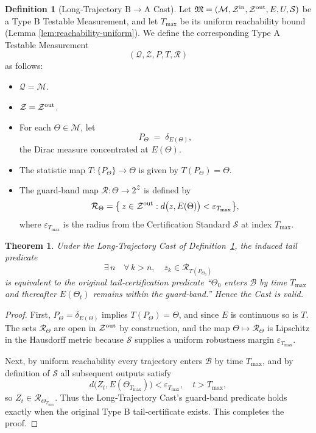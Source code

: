 \documentclass[12pt]{article}
\theoremstyle{definition}
\newtheorem{definition}{Definition}[section]
\theoremstyle{plain}
\newtheorem{theorem}{Theorem}[section]
\begin{document}
\begin{definition}[Long‐Trajectory \(\mathrm B\!\to\!\mathrm A\) Cast]
\label{def:long-trajectory-B-to-A}
Let \(\mathfrak M=(\mathcal M,\mathcal Z^{\rm in},\mathcal Z^{\rm out},E,U,\mathcal S)\) be a Type B Testable Measurement, and let \(T_{\max}\) be its uniform reachability bound (Lemma \ref{lem:reachability-uniform}).  We define the corresponding Type A Testable Measurement
\[
  (\mathcal Q,\mathcal Z,P,T,\mathcal R)
\]
as follows:
\begin{itemize}
  \item \(\mathcal Q = \mathcal M\).
  \item \(\mathcal Z = \mathcal Z^{\rm out}\).
  \item For each \(\Theta\in\mathcal M\), let
    \[
      P_{\Theta} \;=\;\delta_{E(\Theta)},
    \]
    the Dirac measure concentrated at \(E(\Theta)\).
  \item The statistic map 
    \(
      T:\{P_{\Theta}\}\to \Theta
    \) 
    is given by 
    \(T(P_{\Theta})=\Theta\).
  \item The guard‐band map 
    \(\mathcal R:\Theta\to2^{\mathcal Z}\) 
    is defined by
    \[
      \mathcal R_{\Theta}
      = \bigl\{\,z\in\mathcal Z^{\rm out} : d\bigl(z,E(\Theta)\bigr)<\varepsilon_{T_{\max}}\bigr\},
    \]
    where \(\varepsilon_{T_{\max}}\) is the radius from the Certification Standard \(\mathcal S\) at index \(T_{\max}\).
\end{itemize}
\end{definition}

\begin{theorem}
Under the Long‐Trajectory Cast of Definition \ref{def:long-trajectory-B-to-A}, the induced tail predicate
\[
  \exists\,n\quad\forall\,k>n,\quad
    z_k\in\mathcal R_{T(P_{\Theta_0})}
\]
is equivalent to the original tail‐certification predicate “\(\Theta_0\) enters \(\mathcal B\) by time \(T_{\max}\) and thereafter \(E(\Theta_t)\) remains within the guard‐band.”  Hence the Cast is valid.
\end{theorem}

\begin{proof}
First, \(P_{\Theta}=\delta_{E(\Theta)}\) implies \(T(P_{\Theta})=\Theta\), and since \(E\) is continuous so is \(T\).  The sets \(\mathcal R_{\Theta}\) are open in \(\mathcal Z^{\rm out}\) by construction, and the map \(\Theta\mapsto\mathcal R_{\Theta}\) is Lipschitz in the Hausdorff metric because \(\mathcal S\) supplies a uniform robustness margin \(\varepsilon_{T_{\max}}\).

Next, by uniform reachability every trajectory enters \(\mathcal B\) by time \(T_{\max}\), and by definition of \(\mathcal S\) all subsequent outputs satisfy
\[
  d\bigl(Z_t,E(\Theta_{T_{\max}})\bigr)
  < \varepsilon_{T_{\max}},
  \quad t > T_{\max},
\]
so \(Z_t\in\mathcal R_{\Theta_{T_{\max}}}\).  Thus the Long‑Trajectory Cast’s guard‑band predicate holds exactly when the original Type B tail‑certificate exists.  This completes the proof.
\end{proof}
\end{document}

